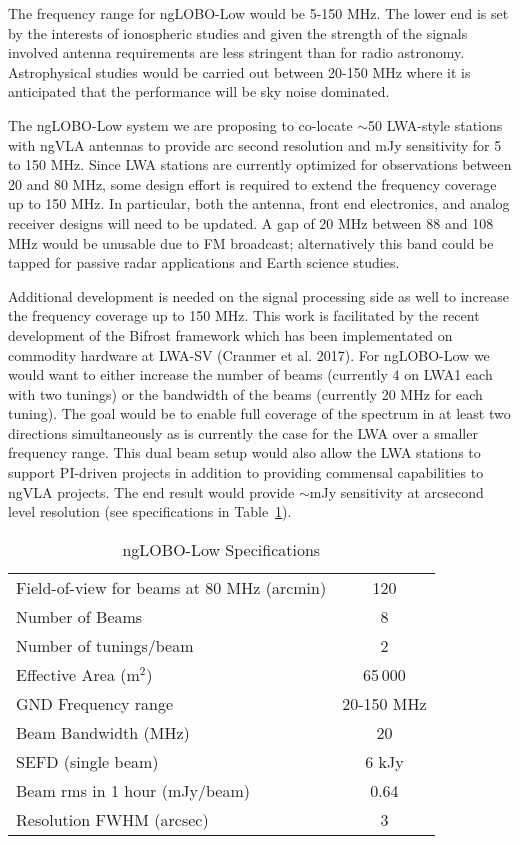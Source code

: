 \documentclass[11pt]{article}
\begin{document}
The frequency range for ngLOBO-Low would be 5-150 MHz.  The lower 
end is set by the interests of ionospheric studies and given the 
strength of the signals involved antenna requirements are less stringent than for radio astronomy.  Astrophysical studies would be carried out between 20-150 MHz
where it is anticipated that the performance will be sky noise
dominated.

The ngLOBO-Low system we are proposing to co-locate $\sim$50 LWA-style stations with ngVLA antennas to provide arc second resolution and mJy sensitivity for 5 to 150 MHz.   Since LWA stations are currently optimized for observations between 20 and 80 MHz, some design effort is required to extend the frequency coverage up to 150 MHz.  In particular, both the antenna, front end electronics, and analog receiver designs will need to be updated. A gap of 20 MHz between 88 and 108 MHz would
be unusable due to FM broadcast; alternatively this band could be tapped for passive radar applications and Earth science studies.

Additional development is needed on the signal processing side as well
to increase the frequency coverage up to 150 MHz.  This work is
facilitated by the recent development of the Bifrost framework which
has been implementated on commodity hardware at LWA-SV (Cranmer et
al. 2017).  For ngLOBO-Low we would want to either increase the number
of beams (currently 4 on LWA1 each with two tunings) or the bandwidth
of the beams (currently 20 MHz for each tuning). The goal would be to
enable full coverage of the spectrum in at least two directions
simultaneously as is currently the case for the LWA over a smaller
frequency range.  This dual beam setup would also allow the LWA
stations to support PI-driven projects in addition to providing
commensal capabilities to ngVLA projects.  The end result would
provide $\sim$mJy sensitivity at arcsecond level resolution (see
specifications in Table~\ref{tabSPECS}).

\begin{table}
\begin{center}
\caption{ngLOBO-Low Specifications}\label{tabSPECS}
\vspace{0.2cm}
\begin{tabular}{lc}
\hline
\hline
Field-of-view for beams at 80 MHz (arcmin) & 120\\
Number of Beams & 8\\
Number of tunings/beam & 2\\
Effective Area (m$^2$) & 65\,000 \\
GND Frequency range & 20-150 MHz \\
Beam Bandwidth (MHz) & 20 \\
SEFD (single beam) & 6 kJy\\
Beam rms in 1 hour (mJy/beam) & 0.64 \\
Resolution FWHM (arcsec) & 3 \\
\hline
\end{tabular}
\end{center}
\end{table}
\end{document}
